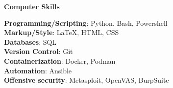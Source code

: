 \documentclass[12pt]{article}
\begin{document}


\vspace{0.12in} %

\begin{center}
	{\noindent \bfseries Computer Skills}
\end{center}

\vspace{0.12pt}

\noindent
{\bfseries Programming/Scripting}: Python, Bash, Powershell \\[0.04in]
{\bfseries Markup/Style}: \LaTeX, HTML, CSS \\[0.04in]
{\bfseries Databases}: SQL \\[0.04in]
{\bfseries Version Control}: Git \\[0.04in]
{\bfseries Containerization}: Docker, Podman  \\[0.04in]
{\bfseries Automation}: Ansible \\[0.04in]
{\bfseries Offensive security}: Metasploit, OpenVAS, BurpSuite \\[0.04in]

\vspace{0.12in} %
\end{document}
